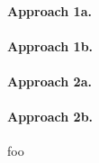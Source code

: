 \documentclass[a4paper]{article}
\def\foo{bar}
\begin{document}
	\paragraph{Approach 1a.} %
	\expandafter\csname \foo{}

	\paragraph{Approach 1b.} %
	\expandafter{}

	\paragraph{Approach 2a.} %
	\csname\expandafter{}\endcsname{}

	\paragraph{Approach 2b.} %
	\expandafter\csname \csname foo\endcsname{}
\end{document}

